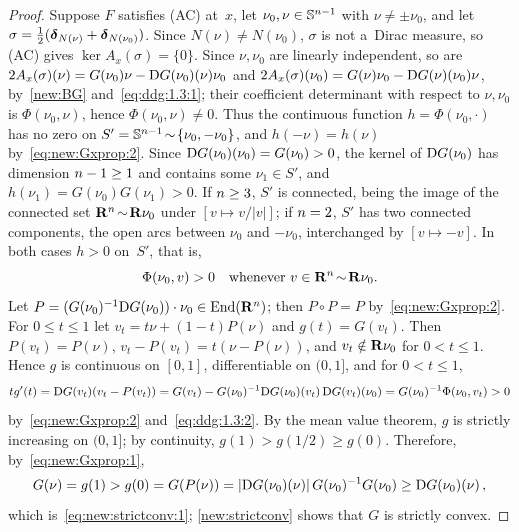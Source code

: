 \documentclass[a4paper,twoside,leqno]{article}
\begin{document}
\begin{proof}
    Suppose $F$ satisfies (AC) at~$x$, let $\nu_0, \nu \in \mathbb{S}^{n-1}$ with $\nu \ne \pm
    \nu_0$, and let $\sigma = \frac 12 (\boldsymbol{\delta}_{N(\nu)} + \boldsymbol{\delta}_{N(\nu_0)})$. Since $N(\nu) \ne
    N(\nu_0)$, $\sigma$ is not a~Dirac measure, so (AC) gives $\ker A_x(\sigma) = \{0\}$. Since
    $\nu, \nu_0$ are linearly independent, so are $2A_x(\sigma)(\nu) = G(\nu_0)\nu - \mathrm{D}
    G(\nu_0)(\nu) \nu_0$ and $2A_x(\sigma)(\nu_0) = G(\nu)\nu_0 - \mathrm{D} G(\nu)(\nu_0) \nu$,
    by~\ref{new:BG} and~\eqref{eq:ddg:1.3:1}; their coefficient determinant with respect to $\nu,
    \nu_0$ is $\Phi(\nu_0,\nu)$, hence $\Phi(\nu_0,\nu) \ne 0$. Thus the continuous function $h =
    \Phi(\nu_0,\cdot)$ has no zero on $S' = \mathbb{S}^{n-1} \!\sim\! \{ \nu_0, -\nu_0 \}$, and
    $h(-\nu) = h(\nu)$ by~\eqref{eq:new:Gxprop:2}. Since $\mathrm{D} G(\nu_0)(\nu_0) = G(\nu_0) > 0$, the
    kernel of $\mathrm{D} G(\nu_0)$ has dimension $n - 1 \ge 1$ and contains some $\nu_1 \in S'$, and
    $h(\nu_1) = G(\nu_0) G(\nu_1) > 0$. If $n \ge 3$, $S'$ is connected, being the image of the
    connected set $\mathbf{R}^{n} \!\sim\! \mathbf{R} \nu_0$ under $[ v \mapsto v/|v| ]$; if $n = 2$, $S'$
    has two connected components, the open arcs between $\nu_0$ and $-\nu_0$, interchanged by $[
    v \mapsto -v ]$. In both cases $h > 0$ on~$S'$, that is,
    \begin{equation}
        \label{eq:ddg:1.3:2}
        \Phi(\nu_0,v) > 0 \quad \text{whenever $v \in \mathbf{R}^{n} \!\sim\! \mathbf{R} \nu_0$}.
    \end{equation}
    Let $P = (G(\nu_0)^{-1} \mathrm{D} G(\nu_0)) \cdot \nu_0 \in \mathrm{End}({\mathbf{R}^{n}})$; then $P \circ P = P$
    by~\eqref{eq:new:Gxprop:2}. For $0 \le t \le 1$ let $v_t = t \nu + (1 - t) P(\nu)$ and $g(t) =
    G(v_t)$. Then $P(v_t) = P(\nu)$, $v_t - P(v_t) = t(\nu - P(\nu))$, and $v_t \notin \mathbf{R} \nu_0$
    for $0 < t \le 1$. Hence $g$ is continuous on $[0,1]$, differentiable on $(0,1]$, and for $0
    < t \le 1$,
    \begin{displaymath}
        t g'(t) = \mathrm{D} G(v_t)(v_t - P(v_t)) = G(v_t) - G(\nu_0)^{-1} \mathrm{D} G(\nu_0)(v_t) \, \mathrm{D}
        G(v_t)(\nu_0) = G(\nu_0)^{-1} \Phi(\nu_0, v_t) > 0
    \end{displaymath}
    by~\eqref{eq:new:Gxprop:2} and~\eqref{eq:ddg:1.3:2}. By the mean value theorem, $g$ is
    strictly increasing on $(0,1]$; by continuity, $g(1) > g(1/2) \ge g(0)$. Therefore, by~\eqref{eq:new:Gxprop:1},
    \begin{displaymath}
        G(\nu) = g(1) > g(0) = G(P(\nu)) = |\mathrm{D} G(\nu_0)(\nu)| \, G(\nu_0)^{-1} G(\nu_0) \ge \mathrm{D}
        G(\nu_0)(\nu) \,,
    \end{displaymath}
    which is~\eqref{eq:new:strictconv:1}; \ref{new:strictconv} shows that $G$ is strictly
    convex.
\end{proof}
\end{document}
